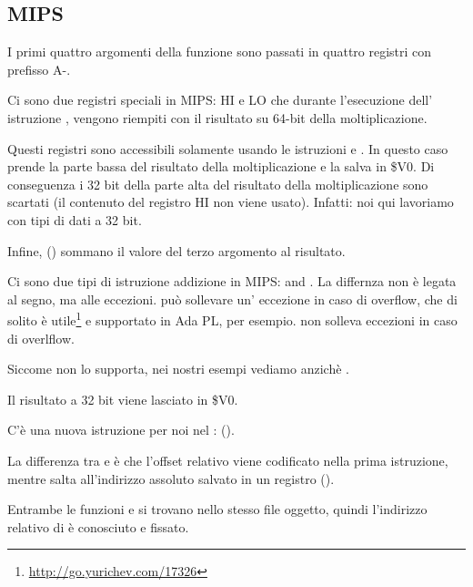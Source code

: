 \subsection{MIPS}



I primi quattro argomenti della funzione sono passati in quattro registri con prefisso A-.


Ci sono due registri speciali in MIPS: HI e LO che durante l'esecuzione dell' istruzione , vengono riempiti con il risultato su 64-bit della moltiplicazione.

Questi registri sono accessibili solamente usando le istruzioni  e .
In questo caso  prende la parte bassa del risultato della moltiplicazione e la salva in \$V0.
Di conseguenza i 32 bit della parte alta del risultato della moltiplicazione sono scartati (il contenuto del registro HI non viene usato).
Infatti: noi qui lavoriamo con tipi di dati \Tint a 32 bit.


Infine,  () sommano il valore del terzo argomento al risultato.


Ci sono due tipi di istruzione addizione in MIPS:  and .
La differnza non è legata al segno, ma alle eccezioni.  può sollevare un' eccezione in caso di overflow, che di solito è utile\footnote{\url{http://go.yurichev.com/17326}} e supportato in Ada \ac{PL}, per esempio.
 non solleva eccezioni in caso di overlflow.

Siccome \CCpp non lo supporta, nei nostri esempi vediamo  anzichè .

Il risultato a 32 bit viene lasciato in \$V0.


C'è una nuova istruzione per noi nel \main:  (). 

La differenza tra  e  è che l'offset relativo viene codificato nella prima istruzione, 
mentre  salta all'indirizzo assoluto salvato in un registro ().

Entrambe le funzioni \ttf e \main si trovano nello stesso file oggetto, quindi l'indirizzo relativo di \ttf è conosciuto e fissato.
